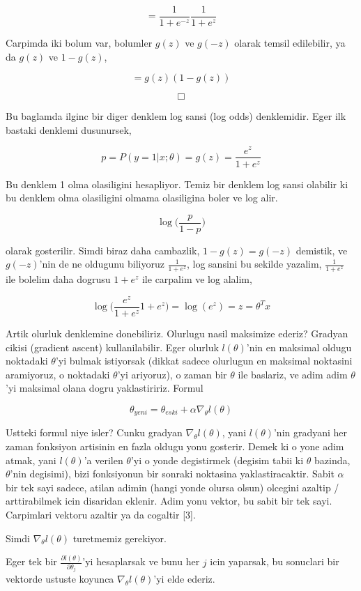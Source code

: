 \documentclass[12pt,fleqn]{article}\usepackage{../common}
\begin{document}
$$
 = \frac{1}{1+e^{-z}} \frac{1}{1+e^{z}}
 $$

Carpimda iki bolum var, bolumler $g(z)$ ve $g(-z)$ olarak temsil
edilebilir, ya da  $g(z)$ ve $1-g(z)$, 

$$
 = g(z)(1-g(z))
 $$

$$ \Box $$

Bu baglamda ilginc bir diger denklem log sansi (log odds) denklemidir. Eger
ilk bastaki denklemi dusunursek,

$$ p = P(y=1|x;\theta) = g(z) = \frac{e^{z}}{1+e^{z}}  $$

Bu denklem 1 olma olasiligini hesapliyor. Temiz bir denklem log sansi
olabilir ki bu denklem olma olasiligini olmama olasiligina boler ve log alir.

$$ \log \bigg( \frac{p}{1-p} \bigg)$$

olarak gosterilir. Simdi biraz daha cambazlik, $1 - g(z) = g(-z)$ demistik,
ve $g(-z)$'nin de ne oldugunu biliyoruz $\frac{1}{1+e^{z}}$, log sansini bu
sekilde yazalim, $\frac{1}{1+e^{z}}$ ile bolelim daha dogrusu $1+e^{z}$ ile
carpalim ve log alalim,

$$ \log \bigg( \frac{e^{z}}{1+e^{z}} 1+e^{z}  \bigg) = \log(e^{z}) = z = \theta^Tx$$

Artik olurluk denklemine donebiliriz. Olurlugu nasil maksimize ederiz?
Gradyan cikisi (gradient ascent) kullanilabilir. Eger olurluk
$l(\theta)$'nin en maksimal oldugu noktadaki $\theta$'yi bulmak
istiyorsak (dikkat sadece olurlugun en maksimal noktasini aramiyoruz,
o noktadaki $\theta$'yi ariyoruz), o zaman bir $\theta$ ile baslariz,
ve adim adim $\theta$'yi maksimal olana dogru yaklastiririz. Formul

$$ \theta_{yeni} = \theta_{eski} + \alpha \nabla_\theta l(\theta)$$

Ustteki formul niye isler? Cunku gradyan $\nabla_\theta l(\theta)$,
yani $l(\theta)$'nin gradyani her zaman fonksiyon artisinin en fazla
oldugu yonu gosterir. Demek ki o yone adim atmak, yani $l(\theta)$'a
verilen $\theta$'yi o yonde degistirmek (degisim tabii ki $\theta$
bazinda, $\theta$'nin degisimi), bizi fonksiyonun bir sonraki
noktasina yaklastiracaktir. Sabit $\alpha$ bir tek sayi sadece, atilan
adimin (hangi yonde olursa olsun) olcegini azaltip / arttirabilmek
icin disaridan eklenir. Adim yonu vektor, bu sabit bir tek
sayi. Carpimlari vektoru azaltir ya da cogaltir [3].

Simdi $\nabla_\theta l(\theta)$ turetmemiz gerekiyor.

Eger tek bir $\frac{\partial l(\theta)}{\partial \theta_j}$'yi
hesaplarsak ve bunu her $j$ icin yaparsak, bu sonuclari bir vektorde
ustuste koyunca $\nabla_\theta l(\theta)$'yi elde ederiz.
\end{document}
